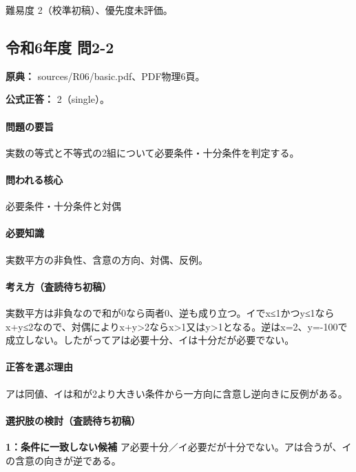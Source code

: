 \par 難易度 2（校準初稿）、優先度未評価。

\subsection{令和6年度 問2-2}
\label{q:r06-reg-basic-2-2}

\noindent\textbf{原典：} sources/R06/basic.pdf、PDF物理6頁。

\textbf{公式正答：} 2（single）。

\paragraph{問題の要旨} 実数の等式と不等式の2組について必要条件・十分条件を判定する。

\paragraph{問われる核心} 必要条件・十分条件と対偶

\paragraph{必要知識} 実数平方の非負性、含意の方向、対偶、反例。

\paragraph{考え方（査読待ち初稿）} 実数平方は非負なので和が0なら両者0、逆も成り立つ。イでx≤1かつy≤1ならx+y≤2なので、対偶によりx+y>2ならx>1又はy>1となる。逆はx=\allowbreak{}2、y=-100で成立しない。したがってアは必要十分、イは十分だが必要でない。

\paragraph{正答を選ぶ理由} アは同値、イは和が2より大きい条件から一方向に含意し逆向きに反例がある。

\paragraph{選択肢の検討（査読待ち初稿）}\mbox{}\par

\noindent\textbf{1：条件に一致しない候補} ア必要十分／イ必要だが十分でない。アは合うが、イの含意の向きが逆である。\par

